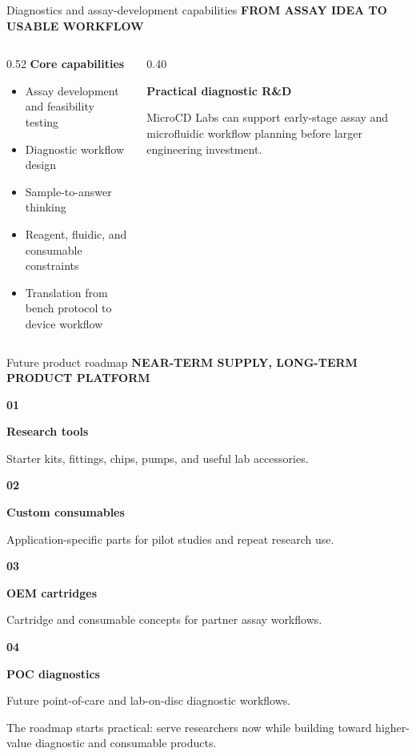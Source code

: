 \documentclass[aspectratio=169]{beamer}
\newcommand{\eyebrow}[1]{%
  {\footnotesize\bfseries\color{MicroCDCoral}\MakeUppercase{#1}}\vspace{0.55em}
}
\newcommand{\muted}[1]{%
  {\color{MicroCDMuted}#1}
}
\newcommand{\roaditem}[3]{%
  \begin{minipage}[t]{0.23\textwidth}
    {\large\bfseries\color{MicroCDGreen}#1}

    \vspace{0.35em}
    {\bfseries #2}

    \vspace{0.25em}
    {\footnotesize\color{MicroCDMuted}#3}
  \end{minipage}
}
\begin{document}
\begin{frame}{Diagnostics and assay-development capabilities}
  \eyebrow{From assay idea to usable workflow}

  \begin{columns}[T]
    \begin{column}{0.52\textwidth}
      {\large\bfseries Core capabilities}

      \begin{itemize}
        \item Assay development and feasibility testing
        \item Diagnostic workflow design
        \item Sample-to-answer thinking
        \item Reagent, fluidic, and consumable constraints
        \item Translation from bench protocol to device workflow
      \end{itemize}
    \end{column}
    \begin{column}{0.40\textwidth}
      \colorbox{MicroCDSoft}{%
        \begin{minipage}[c][0.48\textheight][c]{0.92\linewidth}
          \centering
          {\Large\bfseries Practical diagnostic R\&D}

          \vspace{0.8em}
          \muted{MicroCD Labs can support early-stage assay and microfluidic workflow planning before larger engineering investment.}
        \end{minipage}
      }
    \end{column}
  \end{columns}
\end{frame}

\begin{frame}{Future product roadmap}
  \eyebrow{Near-term supply, long-term product platform}

  \roaditem{01}{Research tools}{Starter kits, fittings, chips, pumps, and useful lab accessories.}
  \hfill
  \roaditem{02}{Custom consumables}{Application-specific parts for pilot studies and repeat research use.}
  \hfill
  \roaditem{03}{OEM cartridges}{Cartridge and consumable concepts for partner assay workflows.}
  \hfill
  \roaditem{04}{POC diagnostics}{Future point-of-care and lab-on-disc diagnostic workflows.}

  \vspace{1.5em}
  \muted{The roadmap starts practical: serve researchers now while building toward higher-value diagnostic and consumable products.}
\end{frame}
\end{document}
